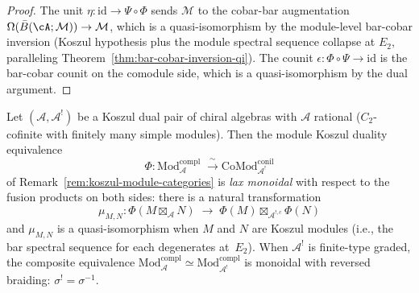 \begin{proof}
The unit $\eta\colon \mathrm{id} \to \Psi \circ \Phi$ sends
$\mathcal{M}$ to the cobar-bar augmentation
$\Omega(\bar{B}(\cA; \mathcal{M})) \to \mathcal{M}$, which is a
quasi-isomorphism by the module-level bar-cobar inversion
(Koszul hypothesis plus the module spectral sequence collapse at
$E_2$, paralleling Theorem~\ref{thm:bar-cobar-inversion-qi}).
The counit $\epsilon\colon \Phi \circ \Psi \to \mathrm{id}$ is
the bar-cobar counit on the comodule side, which is a
quasi-isomorphism by the dual argument.
\end{proof}

\begin{theorem}
\label{thm:monoidal-module-koszul}
Let $(\mathcal{A}, \mathcal{A}^!)$ be a Koszul dual pair of chiral
algebras with $\mathcal{A}$ rational ($C_2$-cofinite with finitely
many simple modules).  Then the module Koszul duality equivalence
\[
\Phi\colon
\mathrm{Mod}^{\mathrm{compl}}_{\mathcal{A}}
\;\xrightarrow{\;\sim\;}
\mathrm{CoMod}^{\mathrm{conil}}_{\mathcal{A}^!}
\]
of Remark~\textup{\ref{rem:koszul-module-categories}} is
\emph{lax monoidal} with respect to the fusion products on both sides:
there is a natural transformation
\begin{equation}\label{eq:monoidal-bar}
\mu_{M,N}\colon
\Phi(M \boxtimes_{\mathcal{A}} N)
\;\longrightarrow\;
\Phi(M) \boxtimes_{\mathcal{A}^{!,c}} \Phi(N)
\end{equation}
and $\mu_{M,N}$ is a quasi-isomorphism when $M$ and $N$ are
Koszul modules \textup{(}i.e., the bar spectral sequence for each
degenerates at~$E_2$\textup{)}.  When $\mathcal{A}^!$ is
finite-type graded, the composite equivalence
$\mathrm{Mod}^{\mathrm{compl}}_{\mathcal{A}} \simeq
\mathrm{Mod}^{\mathrm{compl}}_{\mathcal{A}^!}$
is monoidal with reversed braiding: $\sigma^! = \sigma^{-1}$.
\end{theorem}

